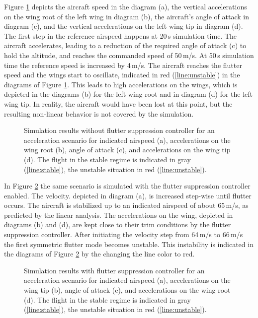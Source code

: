 \documentclass[aerospace,article,submit,moreauthors,pdftex,10pt,a4paper]{Definitions/mdpi}
\begin{document}
Figure \ref{fig:ol} depicts the aircraft speed in the diagram (a), the vertical accelerations on the wing root of the left wing in diagram (b), the aircraft's angle of attack in diagram (c), and the vertical accelerations on the left wing tip in  diagram (d). The first step in the reference airspeed happens at 20\,s simulation time. The aircraft accelerates, leading to a reduction of the required angle of attack (c) to hold the altitude, and reaches the commanded speed of 50\,m/s. At 50\,s simulation time the reference speed is increased by 4\,m/s. The aircraft reaches the flutter speed and the wings start to oscillate, indicated in red (\ref{line:unstable}) in the diagrams of Figure \ref{fig:ol}. This leads to high accelerations on the wings, which is depicted in the diagrams (b) for the left wing root and in diagram (d) for the left wing tip. In reality, the aircraft would have been lost at this point, but the resulting non-linear behavior is not covered by the simulation.

\begin{figure}[h]
	\centering
	
	\caption{Simulation results without flutter suppression controller for an acceleration scenario for indicated airspeed (a), accelerations on the wing root (b), angle of attack (c), and accelerations on the wing tip (d). The flight in the stable regime is indicated in gray (\ref{line:stable}), the unstable situation in red (\ref{line:unstable}). }
	\label{fig:ol}	
\end{figure}


In Figure \ref{fig:cl} the same scenario is simulated with the flutter suppression controller enabled. The velocity. depicted in diagram (a), is increased step-wise until flutter occurs. The aircraft is stabilized up to an indicated airspeed of about 65\,m/s, as predicted by the linear analysis. The accelerations on the wing, depicted in diagrams (b) and (d), are kept close to their trim conditions by the flutter suppression controller. After initiating the velocity step from 64\,m/s to 66\,m/s the first symmetric flutter mode becomes unstable. This instability is indicated in the diagrams of Figure \ref{fig:cl} by the changing the line color to red.

\begin{figure}[th]
	\centering
	
	\caption{Simulation results with flutter suppression controller for an acceleration scenario for indicated airspeed (a), accelerations on the wing tip (b), angle of attack (c), and accelerations on the wing root (d). The flight in the stable regime is indicated in gray (\ref{line:stable}), the unstable situation in red (\ref{line:unstable}).}
	\label{fig:cl}	
\end{figure}
\end{document}
